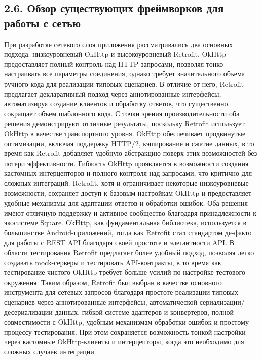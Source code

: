 \documentclass{vsureport}
\begin{document}
\subsection*{2.6. Обзор существующих фреймворков для работы с сетью}

При разработке сетевого слоя приложения рассматривались два основных подхода: низкоуровневый OkHttp и высокоуровневый Retrofit. OkHttp предоставляет полный контроль над HTTP-запросами, позволяя тонко настраивать все параметры соединения, однако требует значительного объема ручного кода для реализации типовых сценариев. В отличие от него, Retrofit предлагает декларативный подход через аннотированные интерфейсы, автоматизируя создание клиентов и обработку ответов, что существенно сокращает объем шаблонного кода.
С точки зрения производительности оба решения демонстрируют отличные результаты, поскольку Retrofit использует OkHttp в качестве транспортного уровня. OkHttp обеспечивает продвинутые оптимизации, включая поддержку HTTP/2, кэширование и сжатие данных, в то время как Retrofit добавляет удобную абстракцию поверх этих возможностей без потери эффективности.
Гибкость OkHttp проявляется в возможности создания кастомных интерцепторов и полного контроля над запросами, что критично для сложных интеграций. Retrofit, хотя и ограничивает некоторые низкоуровневые возможности, сохраняет доступ к базовым настройкам OkHttp и предоставляет удобные механизмы для адаптации ответов и обработки ошибок.
Оба решения имеют отличную поддержку и активное сообщество благодаря принадлежности к экосистеме Square. OkHttp, как фундаментальная библиотека, используется в большинстве Android-приложений, тогда как Retrofit стал стандартом де-факто для работы с REST API благодаря своей простоте и элегантности API.
В области тестирования Retrofit предлагает более удобный подход, позволяя легко создавать mock-серверы и тестировать API-контракты, в то время как тестирование чистого OkHttp требует больше усилий по настройке тестового окружения.
Таким образом, Retrofit был выбран в качестве основного инструмента для сетевых запросов благодаря простоте реализации типовых сценариев через аннотированные интерфейсы, автоматической сериализации/десериализации данных, гибкой системе адаптеров и конвертеров, полной совместимости с OkHttp, удобным механизмам обработки ошибок и простому процессу тестирования. При этом сохраняется возможность тонкой настройки через кастомные OkHttp-клиенты и интерцепторы, когда это необходимо для сложных случаев интеграции.
\end{document}
